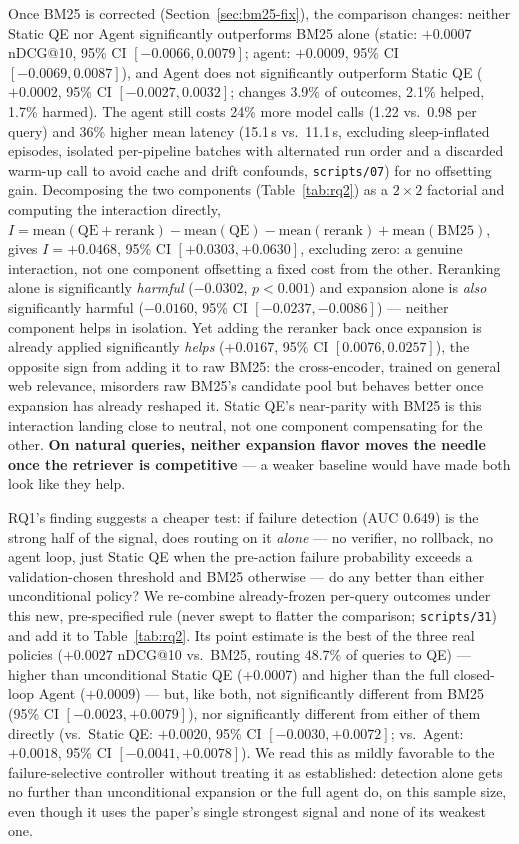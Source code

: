 \documentclass[conference]{IEEEtran}
\begin{document}
Once BM25 is corrected (Section~\ref{sec:bm25-fix}), the comparison
changes: neither Static QE nor Agent significantly
outperforms BM25 alone (static: $+0.0007$ nDCG@10, 95\% CI $[-0.0066,
0.0079]$; agent: $+0.0009$, 95\% CI $[-0.0069, 0.0087]$), and Agent
does not significantly outperform Static QE ($+0.0002$, 95\% CI
$[-0.0027, 0.0032]$; changes 3.9\% of outcomes, 2.1\% helped, 1.7\%
harmed). The agent still costs 24\% more model calls (1.22 vs.\ 0.98
per query) and 36\% higher mean latency (15.1\,s vs.\ 11.1\,s,
excluding sleep-inflated episodes, isolated per-pipeline batches with
alternated run order and a discarded warm-up call to avoid cache and
drift confounds, \texttt{scripts/07}) for no offsetting gain. Decomposing
the two components (Table~\ref{tab:rq2}) as a $2\times2$ factorial and
computing the interaction directly, $I = \text{mean}(\text{QE}+\text{rerank})
- \text{mean}(\text{QE}) - \text{mean}(\text{rerank}) + \text{mean}(\text{BM25})$,
gives $I=+0.0468$, 95\% CI $[+0.0303, +0.0630]$, excluding zero: a
genuine interaction, not one component offsetting a fixed cost from
the other. Reranking alone is significantly \emph{harmful} ($-0.0302$,
$p<0.001$) and expansion alone is \emph{also} significantly harmful
($-0.0160$, 95\% CI $[-0.0237, -0.0086]$) --- neither component helps
in isolation. Yet adding the reranker back once expansion is already
applied significantly \emph{helps} ($+0.0167$, 95\% CI $[0.0076,
0.0257]$), the opposite sign from adding it to raw BM25: the
cross-encoder, trained on general web relevance, misorders raw BM25's
candidate pool but behaves better once expansion has already reshaped
it. Static QE's near-parity with BM25 is this interaction landing
close to neutral, not one component compensating for the other.
\textbf{On natural queries, neither expansion flavor moves the needle
once the retriever is competitive} --- a weaker baseline would have
made both look like they help.

RQ1's finding suggests a cheaper test: if failure detection
(AUC $0.649$) is the strong half of the signal, does routing on it
\emph{alone} --- no verifier, no rollback, no agent loop, just
Static QE when the pre-action failure probability exceeds a
validation-chosen threshold and BM25 otherwise --- do any better than
either unconditional policy? We re-combine already-frozen per-query
outcomes under this new, pre-specified rule (never swept to flatter
the comparison; \texttt{scripts/31}) and add it to Table~\ref{tab:rq2}.
Its point estimate is the best of the three real policies
($+0.0027$ nDCG@10 vs.\ BM25, routing $48.7\%$ of queries to QE) ---
higher than unconditional Static QE ($+0.0007$) and higher than the
full closed-loop Agent ($+0.0009$) --- but, like both, not
significantly different from BM25 (95\% CI $[-0.0023,+0.0079]$), nor
significantly different from either of them directly (vs.\ Static QE:
$+0.0020$, 95\% CI $[-0.0030,+0.0072]$; vs.\ Agent: $+0.0018$, 95\% CI
$[-0.0041,+0.0078]$). We read this as mildly favorable to the
failure-selective controller without treating it as established:
detection alone gets no further than unconditional expansion or the
full agent do, on this sample size, even though it uses the paper's
single strongest signal and none of its weakest one.
\end{document}
